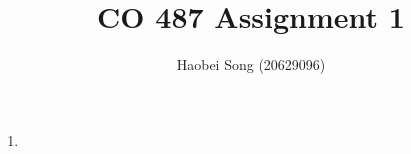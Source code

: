 \documentclass[12pt]{article}
\begin{document}
\title{CO 487 Assignment 1}
\author{Haobei Song (20629096)}
\maketitle

\begin{enumerate}
\item
\end{enumerate}
\end{document}
